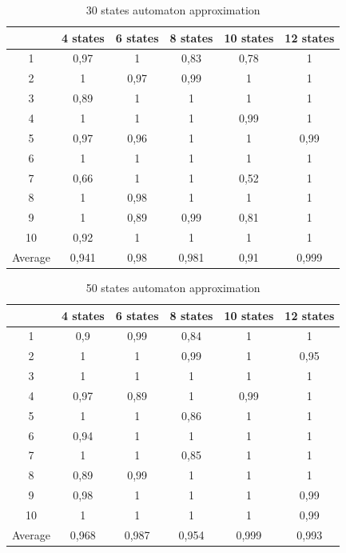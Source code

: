\documentclass[runningheads,a4paper]{llncs}
\begin{document}
\begin{table}[]
\centering
\caption{30 states automaton approximation}
\label{my-label}
\begin{tabular}{@{}cccccc@{}}
\toprule
        & 4 states & 6 states & 8 states & 10 states & 12 states    \\ \midrule
1       & 0,97     & 1        & 0,83     & 0,78      & 1 \\
2       & 1        & 0,97     & 0,99     & 1         & 1 \\
3       & 0,89     & 1        & 1        & 1         & 1 \\
4       & 1        & 1        & 1        & 0,99      & 1   \\
5       & 0,97     & 0,96     & 1        & 1         & 0,99   \\
6       & 1        & 1        & 1        & 1         & 1    \\
7       & 0,66     & 1        & 1        & 0,52      & 1    \\
8       & 1        & 0,98     & 1        & 1         & 1     \\
9       & 1        & 0,89     & 0,99     & 0,81      & 1 \\
10      & 0,92     & 1        & 1        & 1         & 1  \\
Average & 0,941    & 0,98     & 0,981    & 0,91      & 0,999  \\ \bottomrule
\end{tabular}
\end{table}



\begin{table}[]
\centering
\caption{50 states automaton approximation}
\label{my-label}
\begin{tabular}{@{}cccccc@{}}
\toprule
        & 4 states & 6 states & 8 states & 10 states & 12 states    \\ \midrule
1       & 0,9      & 0,99     & 0,84     & 1         & 1 \\
2       & 1        & 1        & 0,99     & 1         & 0,95 \\
3       & 1        & 1        & 1        & 1         & 1 \\
4       & 0,97     & 0,89     & 1        & 0,99      & 1   \\
5       & 1        & 1        & 0,86     & 1         & 1   \\
6       & 0,94     & 1        & 1        & 1         & 1    \\
7       & 1        & 1        & 0,85     & 1         & 1    \\
8       & 0,89     & 0,99     & 1        & 1         & 1     \\
9       & 0,98     & 1        & 1        & 1         & 0,99 \\
10      & 1        & 1        & 1        & 1         & 0,99  \\
Average & 0,968    & 0,987    & 0,954    & 0,999     & 0,993  \\ \bottomrule
\end{tabular}
\end{table}
\end{document}
